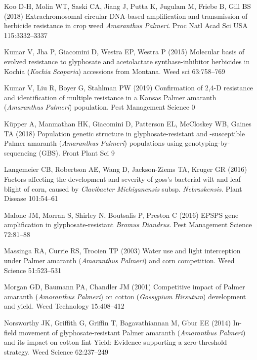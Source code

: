 \documentclass[
  12pt,
  a4paper]{article}
\begin{document}
\leavevmode\hypertarget{ref-koo_extrachromosomal_2018}{}%
Koo D-H, Molin WT, Saski CA, Jiang J, Putta K, Jugulam M, Friebe B, Gill
BS (2018) Extrachromosomal circular DNA-based amplification and
transmission of herbicide resistance in crop weed \emph{Amaranthus}
\emph{Palmeri}. Proc Natl Acad Sci USA 115:3332--3337

\leavevmode\hypertarget{ref-kumar_molecular_2015}{}%
Kumar V, Jha P, Giacomini D, Westra EP, Westra P (2015) Molecular basis
of evolved resistance to glyphosate and acetolactate synthase-inhibitor
herbicides in Kochia (\emph{Kochia} \emph{Scoparia}) accessions from
Montana. Weed sci 63:758--769

\leavevmode\hypertarget{ref-kumar_confirmation_2019}{}%
Kumar V, Liu R, Boyer G, Stahlman PW (2019) Confirmation of 2,4-D
resistance and identification of multiple resistance in a Kansas Palmer
amaranth (\emph{Amaranthus} \emph{Palmeri}) population. Pest Management
Science 0

\leavevmode\hypertarget{ref-kupper_population_2018}{}%
Küpper A, Manmathan HK, Giacomini D, Patterson EL, McCloskey WB, Gaines
TA (2018) Population genetic structure in glyphosate-resistant and
-susceptible Palmer amaranth (\emph{Amaranthus} \emph{Palmeri})
populations using genotyping-by-sequencing (GBS). Front Plant Sci 9

\leavevmode\hypertarget{ref-langemeier_factors_2016}{}%
Langemeier CB, Robertson AE, Wang D, Jackson-Ziems TA, Kruger GR (2016)
Factors affecting the development and severity of goss's bacterial wilt
and leaf blight of corn, caused by \emph{Clavibacter}
\emph{Michiganensis} subsp. \emph{Nebraskensis}. Plant Disease
101:54--61

\leavevmode\hypertarget{ref-malone_epsps_2016}{}%
Malone JM, Morran S, Shirley N, Boutsalis P, Preston C (2016) EPSPS gene
amplification in glyphosate-resistant \emph{Bromus} \emph{Diandrus}.
Pest Management Science 72:81--88

\leavevmode\hypertarget{ref-massinga_water_2003}{}%
Massinga RA, Currie RS, Trooien TP (2003) Water use and light
interception under Palmer amaranth (\emph{Amaranthus} \emph{Palmeri})
and corn competition. Weed Science 51:523--531

\leavevmode\hypertarget{ref-morgan_competitive_2001}{}%
Morgan GD, Baumann PA, Chandler JM (2001) Competitive impact of Palmer
amaranth (\emph{Amaranthus} \emph{Palmeri}) on cotton (\emph{Gossypium}
\emph{Hirsutum}) development and yield. Weed Technology 15:408--412

\leavevmode\hypertarget{ref-norsworthy_-field_2014}{}%
Norsworthy JK, Griffith G, Griffin T, Bagavathiannan M, Gbur EE (2014)
In-field movement of glyphosate-resistant Palmer amaranth
(\emph{Amaranthus} \emph{Palmeri}) and its impact on cotton lint Yield:
Evidence supporting a zero-threshold strategy. Weed Science 62:237--249
\end{document}
